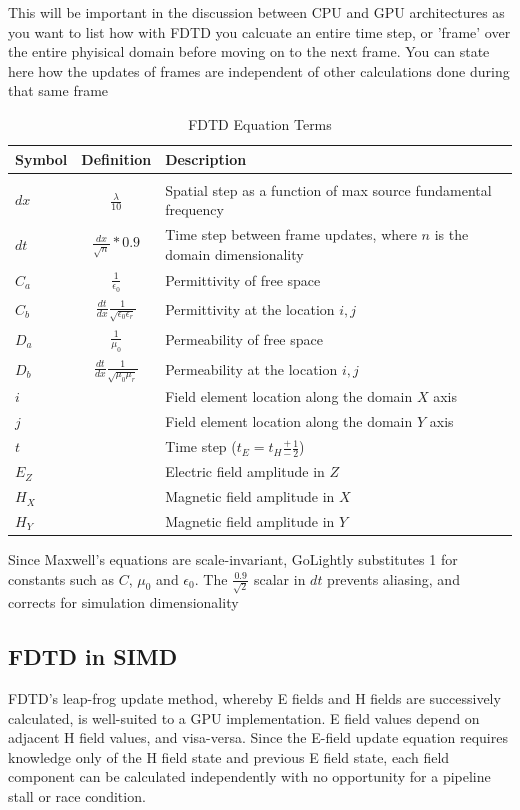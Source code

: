 This will be important in the discussion between CPU and GPU architectures as you want to list how with FDTD you calcuate an entire time step, or 'frame' over the entire phyisical domain before moving on to the next frame.  You can state here how the updates of frames are independent of other calculations done during that same frame
\fi

\begin{table}[h!]
	\centering
	\caption{FDTD Equation Terms}
	\label{tab:modelColorComponentUsage}
	\begin{tabular}{l | c | l}
		Symbol	& Definition & Description \\
		\hline				\\										 	 
		$dx$ 	& $\frac{\lambda}{10}$ 			& Spatial step as a function of max source  fundamental frequency 					\\
		$dt$ 	& $\frac{dx}{\sqrt{n}} * 0.9$		& Time step between frame updates, where $n$ is the domain dimensionality \\		$C_a$	& $\frac{1}{\epsilon_0}$ & Permittivity of free space	\\
		$C_b$	& $\frac{dt}{dx}  \frac{1}{\sqrt{\epsilon_0 \epsilon_r}}$ & Permittivity at the location $i,j$\\
		$D_a$	& $\frac{1}{\mu_0}$	& Permeability of free space \\
		$D_b$	& $\frac{dt}{dx}\frac{1}{\sqrt{\mu_0 \mu_r}}$	& Permeability at the location $i,j$\\

		$i$ 	& &	Field element location along the domain $X$ axis  \\
		$j$   	& &	Field element location along the domain $Y$ axis  \\
		$t$   	& &	Time step ($t_E = t_H \frac{+}{-}\frac{1}{2}$) \\
		$E_Z$ 	& & Electric field amplitude in $Z$ \\
		$H_X$ 	& & Magnetic field amplitude in $X$ \\
		$H_Y$	& & Magnetic field amplitude in $Y$ \\
	\end{tabular}
\end{table}

Since Maxwell's equations are scale-invariant, GoLightly substitutes 1 for constants such as $C$, $\mu_0$ and $\epsilon_0$. The $\frac{0.9}{\sqrt{2}}$ scalar in $dt$ prevents aliasing, and corrects for simulation dimensionality



\subsection{FDTD in SIMD}

FDTD's leap-frog update method, whereby E fields and H fields are successively calculated, is well-suited to a GPU implementation. E field values depend on adjacent H field values, and visa-versa. Since the E-field update equation requires knowledge only of the H field state and previous E field state, each field component can be calculated independently with no opportunity for a pipeline stall or race condition. 

